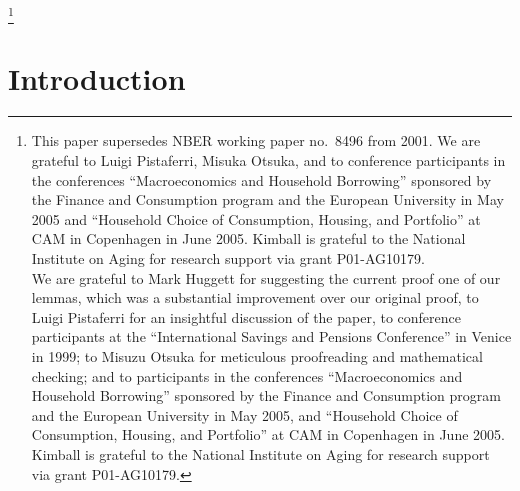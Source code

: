 \documentclass[titlepage]{\econtex}
\begin{document}
\thanks{This paper supersedes NBER working paper no.\ 8496 from 2001. We are grateful to Luigi Pistaferri, Misuka Otsuka, and to conference participants in the conferences ``Macroeconomics and Household Borrowing'' sponsored by the Finance and Consumption program and the European University in May 2005 and ``Household Choice of Consumption, Housing, and Portfolio'' at CAM in Copenhagen in June 2005. Kimball is grateful to the National Institute on Aging for research support via grant P01-AG10179.
  \\ 
We are grateful to Mark Huggett for suggesting the current proof one of our lemmas, which was a substantial improvement over our original proof, to Luigi Pistaferri for an insightful discussion of the paper, to conference participants at the ``International Savings and Pensions Conference'' in Venice in 1999; to Misuzu Otsuka for meticulous proofreading and mathematical checking; and to participants in the conferences ``Macroeconomics and Household Borrowing'' sponsored by the Finance and Consumption program and the European University in May 2005, and ``Household Choice of Consumption, Housing, and Portfolio'' at CAM in Copenhagen in June 2005.  Kimball is grateful to the National Institute on Aging for research support via grant P01-AG10179.}

\titlepagefinish
\setcounter{page}{1}

\setcounter{footnote}{0}


\hypertarget{Introduction}{}
\section{Introduction}\label{sec:Intro}
\end{document}

